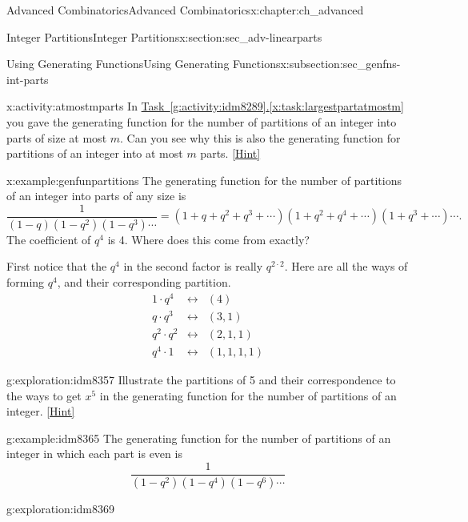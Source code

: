 \documentclass[oneside,10pt,]{book}
\numberwithin{equation}{chapter}
\newcommand{\amp}{&}
\begin{document}
\begin{chapterptx}{Advanced Combinatorics}{}{Advanced Combinatorics}{}{}{x:chapter:ch_advanced}
\begin{sectionptx}{Integer Partitions}{}{Integer Partitions}{}{}{x:section:sec_adv-linearparts}
\begin{subsectionptx}{Using Generating Functions}{}{Using Generating Functions}{}{}{x:subsection:sec_genfns-int-parts}
\begin{activity}{}{x:activity:atmostmparts}%
In \hyperref[x:task:largestpartatmostm]{Task~\ref{g:activity:idm8289}.\ref{x:task:largestpartatmostm}} you gave the generating function for the number of partitions of an integer into parts of size at most \(m\). Can you see why this is also the generating function for partitions of an integer into at most \(m\) parts.%
\space\hspace*{0pt}\hfill{\tiny\hyperlink{g:hint:idm8328-back}{[Hint]}}\end{activity}
\begin{example}{}{x:example:genfunpartitions}%
The generating function for the number of partitions of an integer into parts of any size is%
\begin{equation*}
\frac{1}{(1-q)(1-q^2)(1-q^3) \cdots} = (1+q+q^2+q^3+\cdots)(1+q^2+q^4+\cdots)(1+q^3+\cdots)\cdots\text{.}
\end{equation*}
The coefficient of \(q^4\) is 4.  Where does this come from exactly?%
\par
First notice that the \(q^4\) in the second factor is really \(q^{2\cdot 2}\).  Here are all the ways of forming \(q^4\), and their corresponding partition.%
\begin{align*}
1\cdot q^4 \amp \leftrightarrow \amp (4) \\
q\cdot q^3 \amp \leftrightarrow \amp (3,1) \\
q^2\cdot q^2 \amp \leftrightarrow \amp (2,1,1) \\
q^4 \cdot 1 \amp \leftrightarrow \amp (1,1,1,1) 
\end{align*}
%
\end{example}
\begin{exploration}{}{g:exploration:idm8357}%
Illustrate the partitions of 5 and their correspondence to the ways to get \(x^5\) in the generating function for the number of partitions of an integer.%
\space\hspace*{0pt}\hfill{\tiny\hyperlink{g:hint:idm8361-back}{[Hint]}}\end{exploration}
\begin{example}{}{g:example:idm8365}%
The generating function for the number of partitions of an integer in which each part is even is%
\begin{equation*}
\frac{1}{(1-q^2)(1-q^4)(1-q^6)\cdots}
\end{equation*}
%
\end{example}
\begin{exploration}{}{g:exploration:idm8369}%

\end{exploration}
\end{subsectionptx}
\end{sectionptx}
\end{chapterptx}
\end{document}

